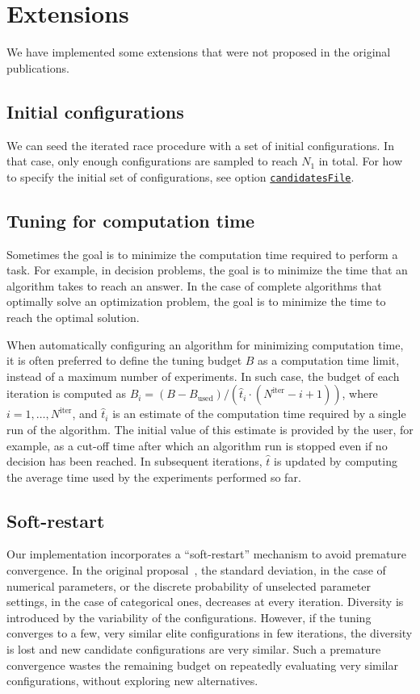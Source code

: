 \documentclass[a4paper]{article}
\newcommand{\IFRACE}{\text{I/F-Race}\xspace}
\newcommand{\iter}{\ensuremath{i}\xspace}
\newcommand{\Budget}{\ensuremath{B}\xspace}
\newcommand{\Budgeti}{\ensuremath{\Budget_{\iter}}\xspace}
\newcommand{\Bused}{\ensuremath{\Budget_\text{used}}\xspace}
\newcommand{\Ncand}[1][]{\ensuremath{N_{#1}}\xspace}
\newcommand{\Niter}{\ensuremath{N^\text{iter}}\xspace}
\newcommand{\tEstimate}{\ensuremath{\hat{t}}\xspace}
\newcommand{\parameter}[1]{\hyperlink{opt:#1}{\texttt{#1}}}
\begin{document}
\section{Extensions}

We have implemented some extensions that were not proposed in the
original publications.

\subsection{Initial configurations}

We can seed the iterated race procedure with a set of initial
configurations. In that case, only enough configurations are sampled
to reach $\Ncand[1]$ in total. For how to specify the initial set of configurations, see option \parameter{candidatesFile}.

\subsection{Tuning for computation time}\label{sec:time}

Sometimes the goal is to minimize the computation time required to
perform a task. For example, in decision problems, the goal is to
minimize the time that an algorithm takes to reach an answer. In the
case of complete algorithms that optimally solve an optimization
problem, the goal is to minimize the time to reach the optimal
solution. 

When automatically configuring an algorithm for minimizing computation
time, it is often preferred to define the tuning budget $\Budget$ as a
computation time limit, instead of a maximum number of experiments. In
such case, the budget of each iteration is computed as $\Budgeti =
(\Budget - \Bused) / (\tEstimate_{\iter}\cdot(\Niter - \iter + 1))$,
where $\iter = 1, \dotsc, \Niter$, and $\tEstimate_{\iter}$ is an
estimate of the computation time required by a single run of the
algorithm. The initial value of this estimate is provided by the user,
for example, as a cut-off time after which an algorithm run is stopped
even if no decision has been reached.  In subsequent iterations,
$\tEstimate$ is updated by computing the average time used by the
experiments performed so far.


\subsection{Soft-restart}

Our implementation incorporates a ``soft-restart'' mechanism to avoid
premature convergence. In the original \IFRACE
proposal~\cite{BalBirStu07}, the standard deviation, in the case of
numerical parameters, or the discrete probability of unselected
parameter settings, in the case of categorical ones, decreases at every
iteration. Diversity is introduced by the variability of the
configurations. However, if the tuning converges to a few, very
similar elite configurations in few iterations, the diversity is lost
and new candidate configurations are very similar. Such a premature
convergence wastes the remaining  budget on repeatedly
evaluating very similar configurations, without exploring new
alternatives.
\end{document}
